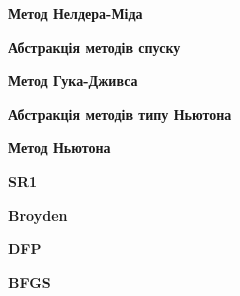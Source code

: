 

\vspace{0.5cm}
\noindent \textbf{Метод Нелдера-Міда}



\vspace{0.5cm}
\noindent \textbf{Абстракція методів спуску}



\vspace{0.5cm}
\noindent \textbf{Метод Гука-Дживса}



\vspace{0.5cm}
\noindent \textbf{Абстракція методів типу Ньютона}



\vspace{0.5cm}
\noindent \textbf{Метод Ньютона}



\vspace{0.5cm}
\noindent \textbf{SR1}



\vspace{0.5cm}
\noindent \textbf{Broyden}



\vspace{0.5cm}
\noindent \textbf{DFP}



\vspace{0.5cm}
\noindent \textbf{BFGS}

